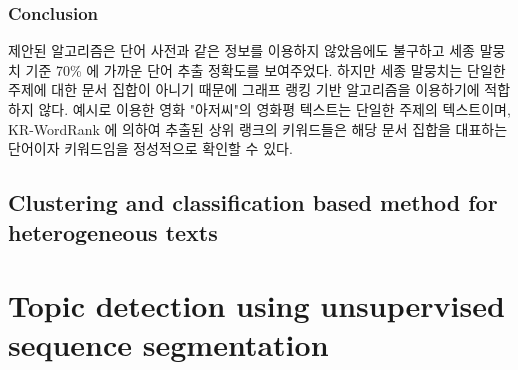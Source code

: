 \documentclass[11pt]{article}
\begin{document}
\subsubsection{Conclusion}

제안된 알고리즘은 단어 사전과 같은 정보를 이용하지 않았음에도 불구하고 세종 말뭉치 기준 70\% 에 가까운 단어 추출 정확도를 보여주었다.
하지만 세종 말뭉치는 단일한 주제에 대한 문서 집합이 아니기 때문에 그래프 랭킹 기반 알고리즘을 이용하기에 적합하지 않다.
예시로 이용한 영화 "아저씨"의 영화평 텍스트는 단일한 주제의 텍스트이며, KR-WordRank 에 의하여 추출된 상위 랭크의 키워드들은 해당 문서 집합을 대표하는 단어이자 키워드임을 정성적으로 확인할 수 있다.


\subsection{Clustering and classification based method for heterogeneous texts}



\section{Topic detection using unsupervised sequence segmentation}




\end{document}
